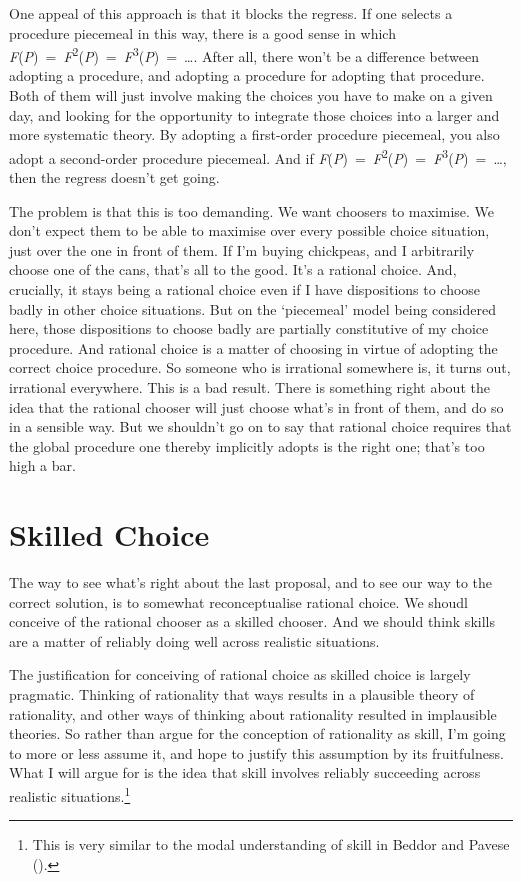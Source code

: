 \documentclass[
  11pt,
  letterpaper,
  DIV=11,
  numbers=noendperiod,
  twoside]{scrartcl}
\begin{document}
One appeal of this approach is that it blocks the regress. If one
selects a procedure piecemeal in this way, there is a good sense in
which
\emph{F}(\emph{P})~=~\emph{F}\textsuperscript{2}(\emph{P})~=~\emph{F}\textsuperscript{3}(\emph{P})~=~\ldots.
After all, there won't be a difference between adopting a procedure, and
adopting a procedure for adopting that procedure. Both of them will just
involve making the choices you have to make on a given day, and looking
for the opportunity to integrate those choices into a larger and more
systematic theory. By adopting a first-order procedure piecemeal, you
also adopt a second-order procedure piecemeal. And if
\emph{F}(\emph{P})~=~\emph{F}\textsuperscript{2}(\emph{P})~=~\emph{F}\textsuperscript{3}(\emph{P})~=~\ldots,
then the regress doesn't get going.

The problem is that this is too demanding. We want choosers to maximise.
We don't expect them to be able to maximise over every possible choice
situation, just over the one in front of them. If I'm buying chickpeas,
and I arbitrarily choose one of the cans, that's all to the good. It's a
rational choice. And, crucially, it stays being a rational choice even
if I have dispositions to choose badly in other choice situations. But
on the `piecemeal' model being considered here, those dispositions to
choose badly are partially constitutive of my choice procedure. And
rational choice is a matter of choosing in virtue of adopting the
correct choice procedure. So someone who is irrational somewhere is, it
turns out, irrational everywhere. This is a bad result. There is
something right about the idea that the rational chooser will just
choose what's in front of them, and do so in a sensible way. But we
shouldn't go on to say that rational choice requires that the global
procedure one thereby implicitly adopts is the right one; that's too
high a bar.

\section{Skilled Choice}\label{skilled-choice}

The way to see what's right about the last proposal, and to see our way
to the correct solution, is to somewhat reconceptualise rational choice.
We shoudl conceive of the rational chooser as a skilled chooser. And we
should think skills are a matter of reliably doing well across realistic
situations.

The justification for conceiving of rational choice as skilled choice is
largely pragmatic. Thinking of rationality that ways results in a
plausible theory of rationality, and other ways of thinking about
rationality resulted in implausible theories. So rather than argue for
the conception of rationality as skill, I'm going to more or less assume
it, and hope to justify this assumption by its fruitfulness. What I will
argue for is the idea that skill involves reliably succeeding across
realistic situations.\footnote{This is very similar to the modal
  understanding of skill in Beddor and Pavese
  ().}
\end{document}
